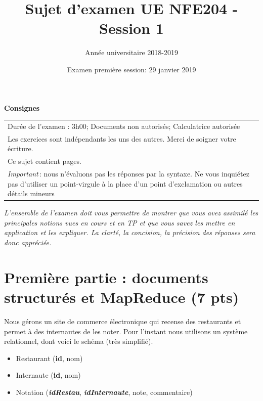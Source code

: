 \documentclass[11pt,a4paper]{article}
\begin{document}
\title{Sujet d'examen UE NFE204 - Session 1}
\author{Année universitaire 2018-2019}
\date{Examen première session: 29 janvier 2019}

\maketitle

\begin{center}
{\bf \Large Consignes}\\
\begin{tabular}{| p{15cm} |}
\hline
Dur\'ee de l'examen : 3h00; Documents non autoris\'es;  Calculatrice autoris\'ee\\

Les exercices sont indépendants les uns des autres. Merci de soigner votre écriture.\\
Ce sujet contient \pageref{LastPage} pages.\\

\textit{Important}\,: nous n'évaluons pas les réponses par la syntaxe. Ne vous
inquiétez pas d'utiliser un point-virgule à la place d'un point d'exclamation ou
autres détails mineurs
\\
\hline
\end{tabular}
\end{center}

\emph{L'ensemble de l'examen doit vous permettre de montrer que vous avez assimilé les principales notions vues
en cours et en TP et que vous savez les mettre en application et les expliquer. La clarté, la concision,
la précision des réponses sera donc appréciée.}

\section*{Première partie : documents structurés et MapReduce (7 pts)}

Nous gérons un site de commerce électronique qui recense des restaurants
et permet à des internautes de les noter. Pour l'instant nous utilisons
un système relationnel, dont voici le schéma (très simplifié).

\begin{itemize}
  \item Restaurant   (\textbf{id}, nom)
  \item Internaute (\textbf{id}, nom)
  \item Notation (\textbf{\textit{idRestau}}, \textbf{\textit{idInternaute}}, note, commentaire)
\end{itemize}
\end{document}
